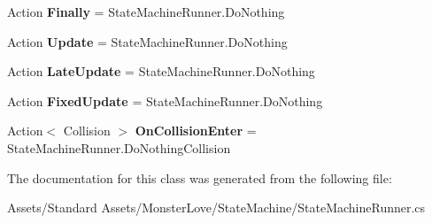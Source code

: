 \begin{DoxyCompactItemize}
\item 
Action {\bfseries Finally} = State\+Machine\+Runner.\+Do\+Nothing\hypertarget{class_monster_love_1_1_state_machine_1_1_state_mapping_a9d7682f2abed660782ee10232069426c}{}\label{class_monster_love_1_1_state_machine_1_1_state_mapping_a9d7682f2abed660782ee10232069426c}

\item 
Action {\bfseries Update} = State\+Machine\+Runner.\+Do\+Nothing\hypertarget{class_monster_love_1_1_state_machine_1_1_state_mapping_a951468e4062be10540d23f1fe1fae043}{}\label{class_monster_love_1_1_state_machine_1_1_state_mapping_a951468e4062be10540d23f1fe1fae043}

\item 
Action {\bfseries Late\+Update} = State\+Machine\+Runner.\+Do\+Nothing\hypertarget{class_monster_love_1_1_state_machine_1_1_state_mapping_a7d8a5c13b5123a9de6964f6511676d03}{}\label{class_monster_love_1_1_state_machine_1_1_state_mapping_a7d8a5c13b5123a9de6964f6511676d03}

\item 
Action {\bfseries Fixed\+Update} = State\+Machine\+Runner.\+Do\+Nothing\hypertarget{class_monster_love_1_1_state_machine_1_1_state_mapping_a9a148f7e399767c406041e9d75109a75}{}\label{class_monster_love_1_1_state_machine_1_1_state_mapping_a9a148f7e399767c406041e9d75109a75}

\item 
Action$<$ Collision $>$ {\bfseries On\+Collision\+Enter} = State\+Machine\+Runner.\+Do\+Nothing\+Collision\hypertarget{class_monster_love_1_1_state_machine_1_1_state_mapping_a78c2b4eff5e44db3e5b29741d946ef72}{}\label{class_monster_love_1_1_state_machine_1_1_state_mapping_a78c2b4eff5e44db3e5b29741d946ef72}

\end{DoxyCompactItemize}


The documentation for this class was generated from the following file\+:\begin{DoxyCompactItemize}
\item 
Assets/\+Standard Assets/\+Monster\+Love/\+State\+Machine/State\+Machine\+Runner.\+cs\end{DoxyCompactItemize}
